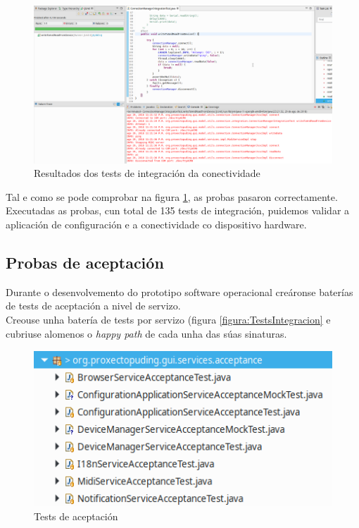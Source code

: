  \begin{figure}[htbp]
  \centering
  \includegraphics[scale=0.45,angle=90,keepaspectratio=true]{./imagenes/resultados-tests-integracion-conectividade.png}
  \caption{Resultados dos tests de integración da conectividade}
  \label{figura:ResultadosTestsIntegracionConectividade}
 \end{figure}
 
 Tal e como se pode comprobar na figura
 \ref{figura:ResultadosTestsIntegracionConectividade}, as probas pasaron
 correctamente. \\
 
 Executadas as probas, cun total de 135 tests de integración, puidemos validar a
 aplicación de configuración e a conectividade co dispositivo hardware.
 
 \subsection{Probas de aceptación}
 
 Durante o desenvolvemento do prototipo software operacional creáronse baterías
 de tests de aceptación a nivel de servizo. \\
 
 Creouse unha batería de tests por servizo (figura \ref{figura:TestsIntegracion}
 e cubriuse alomenos o \textit{happy path} de cada unha das súas sinaturas. \\
  
 \begin{figure}[htbp]
  \centering
  \includegraphics[scale=0.8,keepaspectratio=true]{./imagenes/tests-aceptacion.png}
  \caption{Tests de aceptación}
  \label{figura:TestsAceptacion}
 \end{figure}
 
